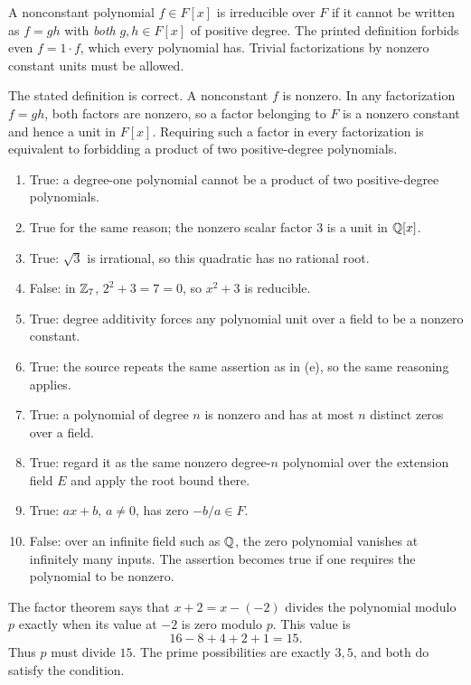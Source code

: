 A nonconstant polynomial $f\in F[x]$ is irreducible over $F$ if it cannot be written as $f=gh$ with \emph{both} $g,h\in F[x]$ of positive degree. The printed definition forbids even $f=1\cdot f$, which every polynomial has. Trivial factorizations by nonzero constant units must be allowed.

The stated definition is correct. A nonconstant $f$ is nonzero. In any factorization $f=gh$, both factors are nonzero, so a factor belonging to $F$ is a nonzero constant and hence a unit in $F[x]$. Requiring such a factor in every factorization is equivalent to forbidding a product of two positive-degree polynomials.

\begin{enumerate}[label=(\alph*)]
\item True: a degree-one polynomial cannot be a product of two positive-degree polynomials.
\item True for the same reason; the nonzero scalar factor $3$ is a unit in $\mathbb{Q}[x]$.
\item True: $\sqrt3$ is irrational, so this quadratic has no rational root.
\item False: in $\mathbb{Z}_7$, $2^2+3=7=0$, so $x^2+3$ is reducible.
\item True: degree additivity forces any polynomial unit over a field to be a nonzero constant.
\item True: the source repeats the same assertion as in (e), so the same reasoning applies.
\item True: a polynomial of degree $n$ is nonzero and has at most $n$ distinct zeros over a field.
\item True: regard it as the same nonzero degree-$n$ polynomial over the extension field $E$ and apply the root bound there.
\item True: $ax+b$, $a\ne0$, has zero $-b/a\in F$.
\item False: over an infinite field such as $\mathbb{Q}$, the zero polynomial vanishes at infinitely many inputs. The assertion becomes true if one requires the polynomial to be nonzero.
\end{enumerate}

The factor theorem says that $x+2=x-(-2)$ divides the polynomial modulo $p$ exactly when its value at $-2$ is zero modulo $p$. This value is
\[16-8+4+2+1=15.
\]
Thus $p$ must divide $15$. The prime possibilities are exactly $\boxed{3,5}$, and both do satisfy the condition.

